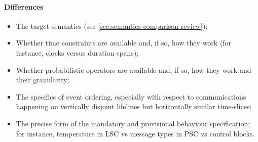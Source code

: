 \paragraph{Differences}

\begin{itemize}
\item The target semantics (see
  \cref{sec:semantics-comparison-review});
\item Whether time constraints are available and, if so, how they work
  (for instance, clocks versus duration spans);
\item Whether probabilistic operators are available and, if so, how
  they work and their granularity;
\item The specifics of event ordering, especially with respect to
  communications happening on vertically disjoint lifelines but
  horizontally similar time-slices;
\item The precise form of the mandatory and provisional behaviour
  specification; for instance, temperature in LSC vs message types in
  PSC vs control blocks.
\end{itemize}

